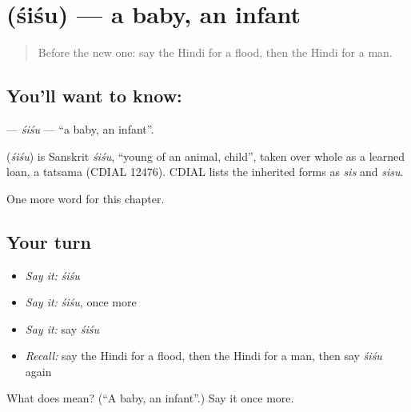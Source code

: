 \section[\texorpdfstring{\hi{शिशु} (śiśu)}{शिशु (śiśu)}]{ (śiśu) — a baby, an infant}

\label{lesson:HI-C253-sisu}



\begin{quote}
Before the new one: say the Hindi for a flood, then the Hindi for a man.
\end{quote}

\subsection*{You'll want to know: }
\textbf{} — \emph{śiśu} — \textquotedblleft{}a baby, an infant\textquotedblright{}.

\begin{cousinweb}
\textbf{} (\emph{śiśu}) is Sanskrit \emph{śiśu}, \textquotedblleft{}young of an animal, child\textquotedblright{}, taken over whole as a learned loan, a tatsama (CDIAL 12476). CDIAL lists the inherited forms as \emph{sis} and \emph{sisu}.
\end{cousinweb}

\begin{grammarlens}[title={What you've built}]
One more word for this chapter.
\end{grammarlens}

\subsection*{Your turn}
\begin{itemize}
\raggedright
  \item \emph{Say it:} \emph{śiśu}
  \item \emph{Say it:} \emph{śiśu}, once more
  \item \emph{Say it:} say \emph{śiśu}
  \item \emph{Recall:} say the Hindi for a flood, then the Hindi for a man, then say \emph{śiśu} again
\end{itemize}

\begin{tcolorbox}[breakable,colback=teal!4,colframe=teal!35!black,title={Before you move on}]
What does  mean? (\textquotedblleft{}A baby, an infant\textquotedblright{}.) Say it once more.
\end{tcolorbox}
